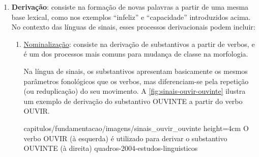 \begin{enumerate}
    \item \textbf{Derivação}: consiste na formação de novas palavras a partir de uma mesma base lexical, como nos exemplos ``infeliz'' e ``capacidade'' introduzidos acima. No contexto das línguas de sinais, esses processos derivacionais podem incluir:


          \begin{enumerate}
              \item \underline{Nominalização}: consiste na derivação de substantivos a partir de verbos, e é um dos processos mais comuns para mudança de classe na morfologia.

                    Na língua de sinais, os substantivos apresentam basicamente os mesmos parâmetros fonológicos que os verbos, mas diferenciam-se pela repetição (ou reduplicação) do seu movimento. A \autoref{fig:sinais-ouvir-ouvinte} ilustra um exemplo de derivação do substantivo OUVINTE a partir do verbo OUVIR.

                    {capitulos/fundamentacao/imagens/sinais_ouvir_ouvinte} %
                    {height=4cm} %
                    {O verbo OUVIR (à esquerda) é utilizado para derivar o substantivo OUVINTE (à direita)} %
                    {quadros-2004-estudos-linguisticos} %






\end{enumerate}
\end{enumerate}
